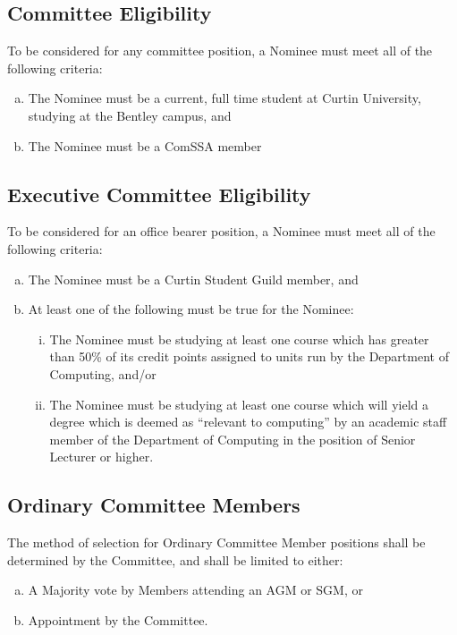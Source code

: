 \documentclass[a4paper,12pt]{article}
\begin{document}
\subsection{Committee Eligibility}

To be considered for any committee position, a Nominee must meet all of the following criteria:

\begin{enumerate}[a)]
	\item The Nominee must be a current, full time student at Curtin University, studying at the Bentley campus, and
	\item The Nominee must be a ComSSA member
\end{enumerate}

\subsection{Executive Committee Eligibility}

To be considered for an office bearer position, a Nominee must meet all of the following criteria:

\begin{enumerate}[a)]
	\item The Nominee must be a Curtin Student Guild member, and
	\item At least one of the following must be true for the Nominee:
	\begin{enumerate}[i)]
		\item The Nominee must be studying at least one course which has greater than 50\% of its credit points assigned to units run by the Department of Computing, and/or
		\item The Nominee must be studying at least one course which will yield a degree which is deemed as ``relevant to computing'' by an academic staff member of the Department of Computing in the position of Senior Lecturer or higher.
	\end{enumerate}
\end{enumerate}

\subsection{Ordinary Committee Members}

The method of selection for Ordinary Committee Member positions shall be determined by the Committee, and shall be limited to either:

\begin{enumerate}[a)]
	\item A Majority vote by Members attending an AGM or SGM, or
	\item Appointment by the Committee.
\end{enumerate}
\end{document}
